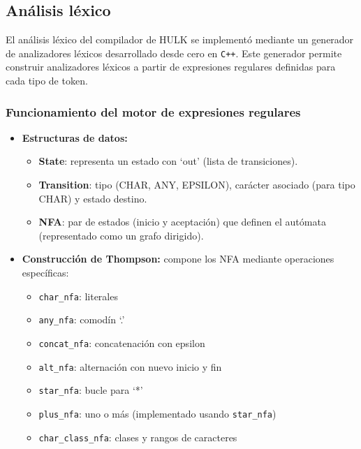 \documentclass{article}
\begin{document}
\subsection{Análisis léxico}

El análisis léxico del compilador de HULK se implementó mediante un generador de analizadores léxicos desarrollado desde cero en \texttt{C++}. Este generador permite construir analizadores léxicos a partir de expresiones regulares definidas para cada tipo de token. 

\subsubsection{Funcionamiento del motor de expresiones regulares}

\begin{itemize}
  \item \textbf{Estructuras de datos:}
  \begin{itemize}
    \item \textbf{State}: representa un estado con `out' (lista de transiciones).
    \item \textbf{Transition}: tipo (CHAR, ANY, EPSILON), carácter asociado (para tipo CHAR) y estado destino.
    \item \textbf{NFA}: par de estados (inicio y aceptación) que definen el autómata (representado como un grafo dirigido).
  \end{itemize}
  
  \item \textbf{Construcción de Thompson:} compone los NFA mediante operaciones específicas:
  \begin{itemize}
    \item \texttt{char\_nfa}: literales
    \item \texttt{any\_nfa}: comodín `.'
    \item \texttt{concat\_nfa}: concatenación con epsilon
    \item \texttt{alt\_nfa}: alternación con nuevo inicio y fin
    \item \texttt{star\_nfa}: bucle para `*'
    \item \texttt{plus\_nfa}: uno o más (implementado usando \texttt{star\_nfa})
    \item \texttt{char\_class\_nfa}: clases y rangos de caracteres
  \end{itemize}
  

\end{itemize}
\end{document}
